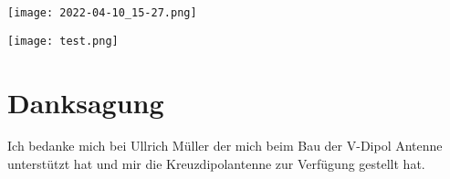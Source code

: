 \begin{center}
    \centering
    \texttt{[image: 2022-04-10\_15-27.png]}
\end{center}

\begin{center}
    \centering
    \texttt{[image: test.png]}
\end{center}



\part*{Danksagung}

Ich bedanke mich bei Ullrich Müller der mich beim Bau der V-Dipol Antenne unterstützt hat und mir die Kreuzdipolantenne zur Verfügung gestellt hat.